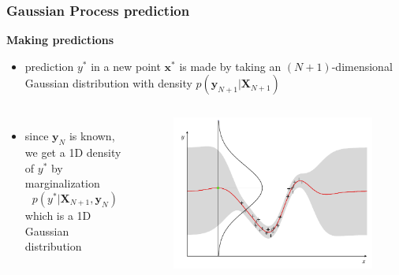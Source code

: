 \documentclass[sans,mathserif]{beamer}
\newcommand{\xx}{\mathrm{\mathbf{x}}}
\newcommand{\XX}{\mathrm{\mathbf{X}}}
\newcommand{\yy}{\mathrm{\mathbf{y}}}
\begin{document}
\begin{frame}
  \frametitle{Gaussian Process prediction}
  \textbf{Making predictions}
  \begin{itemize}
    \item prediction $y^*$ in a new point $\xx^*$ is made by taking an $(N+1)$-dimensional
        Gaussian distribution with density \newline
        $p(\yy_{N+1} | \XX_{N+1})$
  \end{itemize}

  \begin{columns}[T]
  \column{5.5cm}
    \begin{itemize}
    \item since $\yy_N$ is known, we get a \alert{1D density} of $y^*$ by marginalization
        $$p(y^* | \XX_{N+1}, \yy_N)$$
        which is a 1D Gaussian distribution
    \end{itemize}
  \column{4.5cm}
    \begin{figure}
    \includegraphics[width=\linewidth]{img/gp3-gauss}
    \end{figure}
  \end{columns}
\end{frame}
\end{document}

